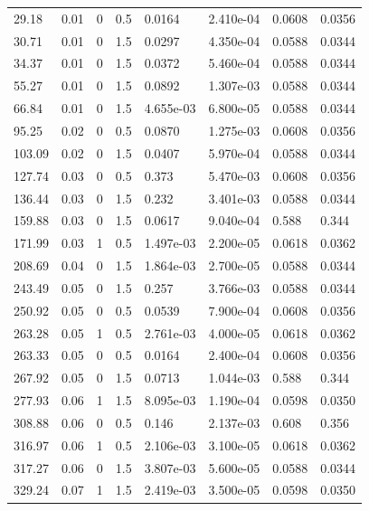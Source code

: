 \documentclass[preview]{standalone}
\begin{document}
{{\begin{tabular}{L{1.2cm}C{1.2cm} C{0.3cm}C{0.5cm} C{1.4cm}C{1.4cm} C{1.4cm}C{1.4cm}}
  29.18  &  0.01  & 0     & 0.5 &  0.0164  & 2.410e-04  & 0.0608 &  0.0356   \\ 
  30.71  &  0.01  & 0     & 1.5 &  0.0297  & 4.350e-04  & 0.0588 &  0.0344   \\ 
  34.37  &  0.01  & 0     & 1.5 &  0.0372  & 5.460e-04  & 0.0588 &  0.0344   \\ 
  55.27  &  0.01  & 0     & 1.5 &  0.0892  & 1.307e-03  & 0.0588 &  0.0344   \\ 
  66.84  &  0.01  & 0     & 1.5 &  4.655e-03  & 6.800e-05  & 0.0588 &  0.0344   \\ 
  95.25  &  0.02  & 0     & 0.5 &  0.0870  & 1.275e-03  & 0.0608 &  0.0356   \\ 
  103.09  &  0.02  & 0     & 1.5 &  0.0407  & 5.970e-04  & 0.0588 &  0.0344   \\ 
  127.74  &  0.03  & 0     & 0.5 &  0.373  & 5.470e-03  & 0.0608 &  0.0356   \\ 
  136.44  &  0.03  & 0     & 1.5 &  0.232  & 3.401e-03  & 0.0588 &  0.0344   \\ 
  159.88  &  0.03  & 0     & 1.5 &  0.0617  & 9.040e-04  & 0.588 &  0.344   \\ 
  171.99  &  0.03  & 1     & 0.5 &  1.497e-03  & 2.200e-05  & 0.0618 &  0.0362   \\ 
  208.69  &  0.04  & 0     & 1.5 &  1.864e-03  & 2.700e-05  & 0.0588 &  0.0344   \\ 
  243.49  &  0.05  & 0     & 1.5 &  0.257  & 3.766e-03  & 0.0588 &  0.0344   \\ 
  250.92  &  0.05  & 0     & 0.5 &  0.0539  & 7.900e-04  & 0.0608 &  0.0356   \\ 
  263.28  &  0.05  & 1     & 0.5 &  2.761e-03  & 4.000e-05  & 0.0618 &  0.0362   \\ 
  263.33  &  0.05  & 0     & 0.5 &  0.0164  & 2.400e-04  & 0.0608 &  0.0356   \\ 
  267.92  &  0.05  & 0     & 1.5 &  0.0713  & 1.044e-03  & 0.588 &  0.344   \\ 
  277.93  &  0.06  & 1     & 1.5 &  8.095e-03  & 1.190e-04  & 0.0598 &  0.0350   \\ 
  308.88  &  0.06  & 0     & 0.5 &  0.146  & 2.137e-03  & 0.608 &  0.356   \\ 
  316.97  &  0.06  & 1     & 0.5 &  2.106e-03  & 3.100e-05  & 0.0618 &  0.0362   \\ 
  317.27  &  0.06  & 0     & 1.5 &  3.807e-03  & 5.600e-05  & 0.0588 &  0.0344   \\ 
  329.24  &  0.07  & 1     & 1.5 &  2.419e-03  & 3.500e-05  & 0.0598 &  0.0350   \\ 

\end{tabular}}}
\end{document}
